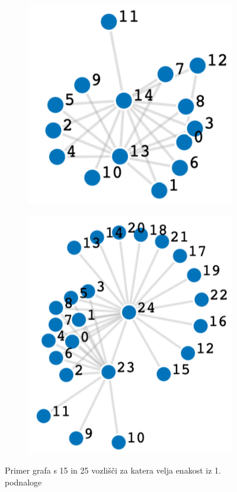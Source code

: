 \documentclass[12pt,a4paper]{amsart}
\theoremstyle{plain} %
\begin{document}
\bigskip
\begin{figure}[h]
    \centering
    \begin{subfigure}{0.25\textwidth}
    \centering
    \includegraphics[width = \textwidth]{slike/graf15.png}
    \end{subfigure}
    \begin{subfigure}{0.25\textwidth}
    \centering
    \includegraphics[width = \textwidth]{slike/graf25.png}
    \end{subfigure}
    \caption{Primer grafa s 15 in 25 vozlišči za katera velja enakost iz 1. podnaloge}
    \label{fig:slika2}
\end{figure}%
\end{document}
